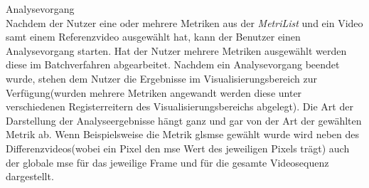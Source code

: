 
% 
 Analysevorgang \\
Nachdem der Nutzer eine oder mehrere Metriken aus der \emph{MetriList} und ein
Video samt einem Referenzvideo ausgewählt hat, kann der Benutzer einen Analysevorgang starten. Hat der
Nutzer mehrere Metriken ausgewählt werden diese im Batchverfahren abgearbeitet. Nachdem ein Analysevorgang
beendet wurde, stehen dem Nutzer die Ergebnisse im Visualisierungsbereich zur Verfügung(wurden 
mehrere Metriken angewandt werden diese unter verschiedenen Registerreitern des Visualisierungsbereichs
abgelegt). Die Art der Darstellung der Analyseergebnisse hängt ganz und gar von der Art der gewählten 
Metrik ab. Wenn Beispielsweise die Metrik gls{mse} gewählt wurde wird neben des Differenzvideos(wobei ein
Pixel den \gls{mse} Wert des jeweiligen Pixels trägt) auch der globale \gls{mse} für das jeweilige Frame
und für die gesamte Videosequenz dargestellt.


